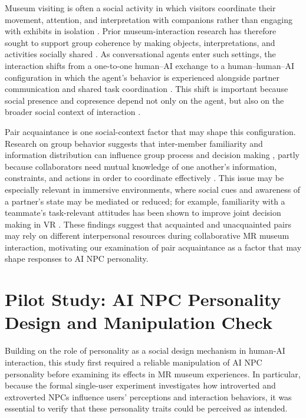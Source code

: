 \documentclass[a4paper,fleqn]{cas-sc}
\begin{document}
Museum visiting is often a social activity in which visitors coordinate their movement, attention, and interpretation with companions rather than engaging with exhibits in isolation \citep{tolmieSupportingGroupInteractions2014}. Prior museum-interaction research has therefore sought to support group coherence by making objects, interpretations, and activities socially shared \citep{foshSupportingGroupCoherence2016, foshGiftingPersonalInterpretations2014, rydingInterpersonalizingIntimateMuseum2021, klopferMysteryMuseumCollaborative2005}. As conversational agents enter such settings, the interaction shifts from a one-to-one human--AI exchange to a human--human--AI configuration in which the agent's behavior is experienced alongside partner communication and shared task coordination \citep{zhengUXResearchConversational2022}. This shift is important because social presence and copresence depend not only on the agent, but also on the broader social context of interaction \citep{ohSystematicReviewSocial2018, pimentelCopresenceVirtualHumans2021}.

Pair acquaintance is one social-context factor that may shape this configuration. Research on group behavior suggests that inter-member familiarity and information distribution can influence group process and decision making \citep{rockettFamiliarityGroupsExploring2002, gruenfeldGroupCompositionDecision1996}, partly because collaborators need mutual knowledge of one another's information, constraints, and actions in order to coordinate effectively \citep{cramtonMutualKnowledgeProblem2001}. This issue may be especially relevant in immersive environments, where social cues and awareness of a partner's state may be mediated or reduced; for example, familiarity with a teammate's task-relevant attitudes has been shown to improve joint decision making in VR \citep{mooreFamiliarityTeammatesAttitudes2020}. These findings suggest that acquainted and unacquainted pairs may rely on different interpersonal resources during collaborative MR museum interaction, motivating our examination of pair acquaintance as a factor that may shape responses to AI NPC personality.

\section{Pilot Study: AI NPC Personality Design and Manipulation Check}

Building on the role of personality as a social design mechanism in human-AI interaction, this study first required a reliable manipulation of AI NPC personality before examining its effects in MR museum experiences. In particular, because the formal single-user experiment investigates how introverted and extroverted NPCs influence users' perceptions and interaction behaviors, it was essential to verify that these personality traits could be perceived as intended.
\end{document}
